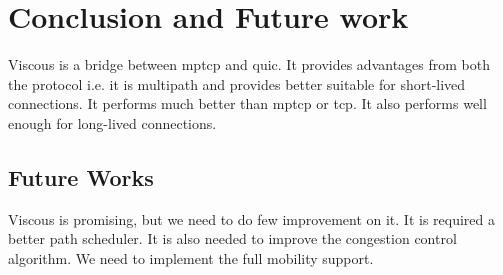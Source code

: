 \section{Conclusion and Future work}
Viscous is a bridge between \acrshort{mptcp} and \acrshort{quic}. It provides advantages from both the protocol i.e. it is multipath and provides better suitable for short-lived connections. It performs much better than \acrshort{mptcp} or \acrshort{tcp}. It also performs well enough for long-lived connections.

\subsection{Future Works}
Viscous is promising, but we need to do few improvement on it. It is required a better path scheduler. It is also needed to improve the congestion control algorithm. We need to implement the full mobility support.
